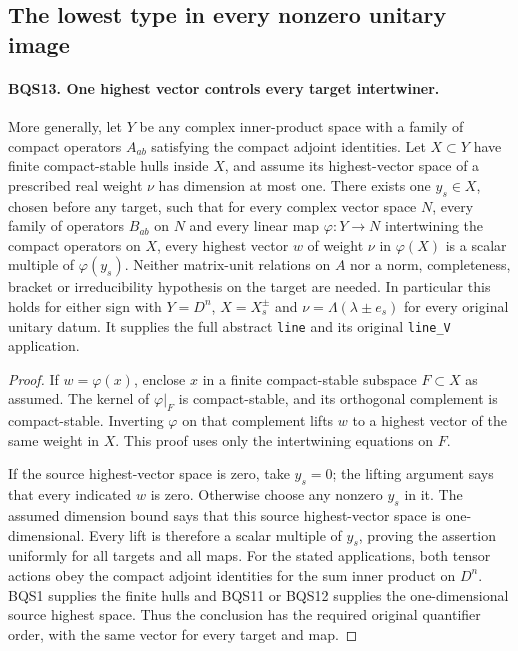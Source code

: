 \subsection{The lowest type in every nonzero unitary image}

\paragraph{BQS13. One highest vector controls every target intertwiner.}
\label{claim:BQS13}
More generally, let $Y$ be any complex inner-product space with a
family of compact operators $A_{ab}$ satisfying the compact adjoint
identities.  Let $X\subset Y$ have finite compact-stable hulls inside
$X$, and assume its highest-vector space of a prescribed real weight
$\nu$ has dimension at most one.
There exists one $y_s\in X$, chosen before any target, such that for
every complex vector space $N$, every family of operators $B_{ab}$
on $N$ and every linear map $\varphi:Y\to N$ intertwining the compact
operators on $X$, every highest vector $w$ of weight $\nu$ in
$\varphi(X)$ is a scalar multiple of $\varphi(y_s)$.
Neither matrix-unit relations on $A$ nor a norm, completeness,
bracket or irreducibility hypothesis on the target are needed.
In particular this holds for either sign with $Y=D^n$,
$X=X_s^\pm$ and $\nu=\Lambda(\lambda\pm e_s)$ for every original
unitary datum.  It supplies the full abstract \texttt{line} and
its original \texttt{line\_V} application.

\begin{proof}
If $w=\varphi(x)$, enclose $x$ in a finite compact-stable
subspace $F\subset X$ as assumed.
The kernel of $\varphi|_F$ is compact-stable, and its orthogonal
complement is compact-stable.  Inverting $\varphi$ on that complement
lifts $w$ to a highest vector of the same weight in $X$.
This proof uses only the intertwining equations on $F$.

If the source highest-vector space is zero, take $y_s=0$; the lifting
argument says that every indicated $w$ is zero.
Otherwise choose any nonzero $y_s$ in it.  The assumed dimension
bound says that this source highest-vector space is one-dimensional.  Every lift is
therefore a scalar multiple of $y_s$, proving the assertion uniformly
for all targets and all maps.
For the stated applications, both tensor actions obey the compact
adjoint identities for the sum inner product on $D^n$.
BQS1 supplies the finite hulls and BQS11 or BQS12 supplies the
one-dimensional source highest space.  Thus the conclusion has
the required original quantifier order, with the same vector for
every target and map.
\end{proof}

